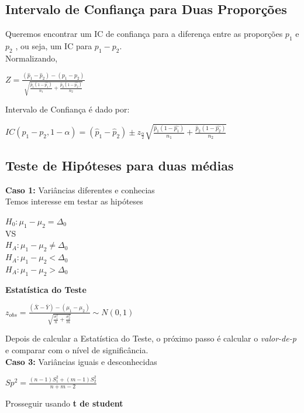 \documentclass[a4paper, 12pt]{article}
\begin{document}
\subsection{Intervalo de Confiança para Duas Proporções}
	Queremos encontrar um IC de confiança para a diferença entre as proporções $p_1$ e $p_2$ , ou seja, um IC para $p_1-p_2$.\\
		
		Normalizando,
		\begin{center}
			\Large
			$
			Z = \frac{(\hat{p}_1 - \hat{p}_2)-(p_1-p_2)}{\sqrt{\frac{\hat{p}_1(1-\hat{p_1})}{n_1} + \frac{\hat{p}_2(1-\hat{p_2})}{n_2}}}
			$
		\end{center}
	
		Intervalo de Confiança é dado por:
			\begin{center}
				\Large
				$
				IC(p_1-p_2, 1-\alpha) = (\hat{p}_1 - \hat{p}_2) \pm z_{\frac{\alpha}{2}}\sqrt{\frac{\hat{p}_1(1-\hat{p_1})}{n_1} + \frac{\hat{p}_2(1-\hat{p_2})}{n_2}}
				$
			\end{center}

\subsection{Teste de Hipóteses para duas médias}
	\textbf{Caso 1:} Variâncias diferentes e conhecias\\
	Temos interesse em testar as hipóteses
		\begin{center}
			\Large
			$
			H_0: \mu_1 - \mu_2 = \Delta_0 
			$\\VS\\
			$
			H_A: \mu_1 - \mu_2 \neq \Delta_0 
			$\\
			$
			H_A: \mu_1 - \mu_2 < \Delta_0 
			$\\
			$
			H_A: \mu_1 - \mu_2 > \Delta_0 
			$
		\end{center}
	\textbf{Estatística do Teste}
		\begin{center}
			\Large
			$
			z_{obs} = \frac{(\bar{X} - \bar{Y}) - (\mu_1-\mu_2)}{\sqrt{\frac{\sigma^2_1}{n} + \frac{\sigma^2_2}{m}}} \sim N(0, 1)
			$
		\end{center}
	Depois de calcular a Estatística do Teste, o próximo passo é calcular o \textit{valor-de-p} e comparar com o nível de significância.\\
	
	\textbf{Caso 3:} Variâncias iguais e desconhecidas\\
		\begin{center}
			\Large
			$
			Sp^2 = \frac{(n-1)S^2_1 + (m-1)S^2_2}{n+m-2}
			$
		\end{center}
	Prosseguir usando \textbf{t de student}
\end{document}

